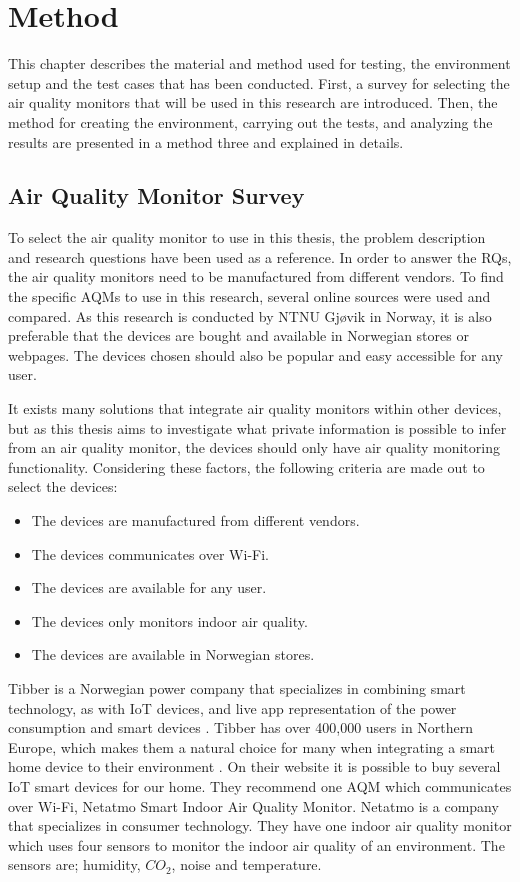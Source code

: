 \chapter{Method}
This chapter describes the material and method used for testing, the environment setup and the test cases that has been conducted. First, a survey for selecting the air quality monitors that will be used in this research are introduced. Then, the method for creating the environment, carrying out the tests, and analyzing the results are presented in a method three and explained in details.  

\section{Air Quality Monitor Survey}
To select the air quality monitor to use in this thesis, the problem description and research questions have been used as a reference. In order to answer the RQs, the air quality monitors need to be manufactured from different vendors. To find the specific \gls{AQM}s to use in this research, several online sources were used and compared. As this research is conducted by NTNU Gjøvik in Norway, it is also preferable that the devices are bought and available in Norwegian stores or webpages. The devices chosen should also be popular and easy accessible for any user. 

It exists many solutions that integrate air quality monitors within other devices, but as this thesis aims to investigate what private information is possible to infer from an air quality monitor, the devices should only have air quality monitoring functionality.  Considering these factors, the following criteria are made out to select the devices:
\begin{itemize}
    \item The devices are manufactured from different vendors.
    \item The devices communicates over \gls{Wi-Fi}.
    \item The devices are available for any user.
    \item The devices only monitors indoor air quality.
    \item The devices are available in Norwegian stores.
\end{itemize}
Tibber \cite{Tibber} is a Norwegian power company that specializes in combining smart technology, as with \gls{IoT} devices, and live app representation of the power consumption and smart devices \cite{Tibber}.  Tibber has over 400,000 users in Northern Europe, which makes them a natural choice for many when integrating a smart home device to their environment \cite{TibberUsers}. On their website it is possible to buy several \gls{IoT} smart devices for our home. They recommend one \gls{AQM} which communicates over \gls{Wi-Fi}, Netatmo Smart Indoor Air Quality Monitor. Netatmo \cite{Netatmo} is a company that specializes in consumer technology. They have one indoor air quality monitor which uses four sensors to monitor the indoor air quality of an environment. The sensors are; humidity, \(CO_2\), noise and temperature. 

